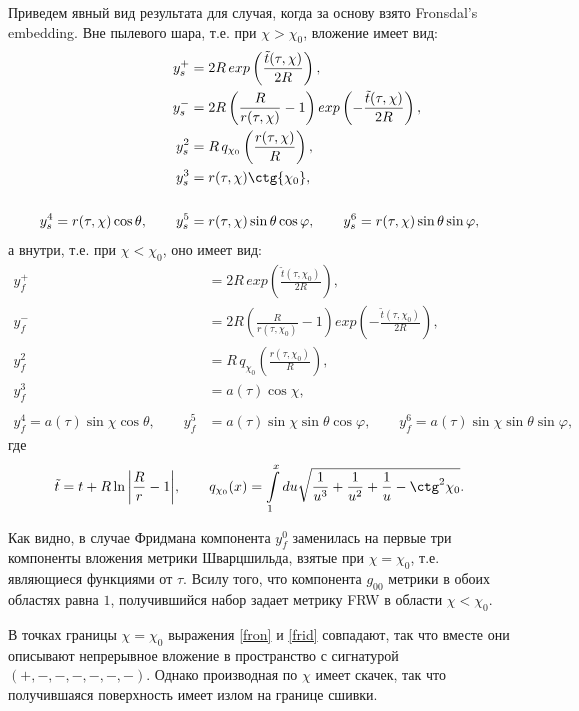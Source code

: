 \documentclass[12pt]{article}
\newcommand{\bq}{\begin{equation}}
\newcommand{\eq}{\end{equation}}
\begin{document}
Приведем явный вид результата для случая, когда за основу взято Fronsdal’s embedding.
Вне пылевого шара, т.е. при $\chi>\chi_0$, вложение имеет вид:
\begin{align}
	y_s^+ &= 2R \, exp\left({\frac{\tilde{t}(\tau, \chi)}{2R}} \right), \nonumber \\
	y_s^- &= 2R \left(\frac{R}{r(\tau, \chi)}-1\right) exp \left(-{\frac{\tilde{t}(\tau, \chi)}{2R}} \right), \nonumber \\
\label{fron}	y_s^2  &= R \, q_{\chi_0} \left( \frac{r(\tau, \chi)}{R} \right), \\
	y_s^3 &= r(\tau, \chi) \ctg{\chi_0}, \nonumber \\
	\nonumber \\
	y_s^4 = r(\tau, \chi) \cos{\theta}, \qquad y_s^5 &= r(\tau, \chi) \sin{\theta} \cos{\varphi}, \qquad y_s^6 = r(\tau, \chi) \sin{\theta} \sin{\varphi}, \nonumber 
\end{align}
а внутри,  т.е. при $\chi<\chi_0$, оно имеет вид:
\begin{align}
	y_f^+ &= 2R \, exp \left({\frac{\tilde{t}(\tau, \chi_0)}{2R}} \right), \nonumber \\
	y_f^- &= 2R \left(\frac{R}{r(\tau, \chi_0)}-1\right) exp \left(-{\frac{\tilde{t}(\tau, \chi_0)}{2R}} \right), \nonumber \\
\label{frid}	y_f^2  &= R \, q_{\chi_0} \left( \frac{r(\tau, \chi_0)}{R} \right), \\
	y_f^3 &= a(\tau) \cos{\chi}, \nonumber \\
	\nonumber \\
	y_f^4 = a(\tau) \sin{\chi} \cos{\theta}, \qquad y_f^5 &= a(\tau) \sin{\chi} \sin{\theta} \cos{\varphi}, \qquad y_f^6 = a(\tau) \sin{\chi} \sin{\theta} \sin{\varphi}, \nonumber 
\end{align}
где 
\bq
\tilde{t} = t + R \ln{\left| \frac{R}{r} - 1 \right|}, \qquad q_{\chi_0}(x) = \int \limits_1^x d u \sqrt{\frac{1}{u^3}+\frac{1}{u^2}+\frac{1}{u}-\ctg^2{\chi_0}}.
\eq

Как видно, в случае Фридмана компонента $y_f^0$ заменилась на первые три компоненты вложения метрики Шварцшильда, взятые при $\chi = \chi_0$, т.е. являющиеся функциями от $\tau$. Всилу того, что  компонента $g_{00}$ метрики в обоих областях равна $1$, получившийся набор задает метрику FRW в области $\chi< \chi_0$.
 
В точках границы $\chi=\chi_0$ выражения \eqref{fron} и \eqref{frid} совпадают, так что вместе они описывают непрерывное вложение в пространство с сигнатурой $(+, -, -, -, -, -, -)$.
Однако производная по $\chi$ имеет скачек, так что получившаяся поверхность имеет излом на границе сшивки.
\end{document}
